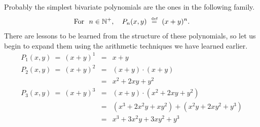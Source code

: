Probably the simplest bivariate polynomials are the ones in the
following family.
\begin{equation}
\label{eq:binomial-polys}
\mbox{For } \ n \in \mathbb{N}^+, \ \ \
P_n(x,y) \ \stackrel{\mbox{{\tiny def}}}{=} \ (x+y)^n.
\end{equation}
There are lessons to be learned from the structure of these
polynomials, so let us begin to expand them using the arithmetic
techniques we have learned earlier.
\begin{eqnarray*}
P_1(x,y) \ = \
(x+y)^1 & = & x+y  \\
P_2(x,y) \ = \
(x+y)^2 & = & (x+y) \cdot (x+y) \\
        & = & x^2 + 2xy + y^2 \\
P_3(x,y) \ = \
(x+y)^3 & = & (x+y) \cdot (x^2 + 2xy + y^2) \\
   & = & (x^3 + 2x^2y +  xy^2) + (x^2y + 2xy^2 + y^3) \\
   & = & x^3 + 3x^2y + 3xy^2 + y^3  
\end{eqnarray*}

